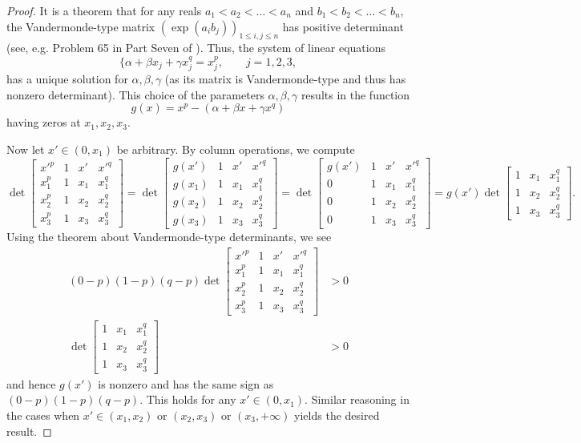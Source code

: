 \documentclass[10pt]{amsart}
\newcommand{\1}{\textbf{1}}
\theoremstyle{remark}
\theoremstyle{definition}
\begin{document}
\begin{proof}
It is a theorem that for any reals $a_1<a_2<\dots<a_n$ and $b_1<b_2<\dots<b_n$, the Vandermonde-type matrix $(\exp(a_ib_j))_{1\le i,j \le n}$ has positive determinant (see, e.g. Problem 65 in Part Seven of \cite{PS}).
Thus, the system of linear equations 
\[ 
\Big\{ \alpha + \beta x_j + \gamma x_j^q = x_j^p, \qquad j = 1, 2, 3,
 \]
has a unique solution for $\alpha, \beta, \gamma$ (as its matrix is Vandermonde-type and thus has nonzero determinant). This choice of the parameters $\alpha, \beta, \gamma$ results in the function
\[ 
g(x) = x^p - (\alpha + \beta x + \gamma x^q)
 \]
having zeros at $x_1, x_2, x_3$. 

Now let $x'\in(0,x_1)$ be arbitrary. By column operations, we compute \[\det\left[\begin{smallmatrix}
x'^p&1&x'&x'^q\\ x_1^p & 1& x_1 & x_1^q \\ x_2^p &1& x_2 & x_2^q\\ x_3^p &1& x_3 & x_3^q
\end{smallmatrix}\right] = \det\left[\begin{smallmatrix}
g(x')&1&x'&x'^q\\ g(x_1) & 1& x_1 & x_1^q \\ g(x_2) &1& x_2 & x_2^q\\ g(x_3) &1& x_3 & x_3^q
\end{smallmatrix}\right] = \det\left[\begin{smallmatrix}
g(x')&1&x'&x'^q\\ 0 & 1& x_1 & x_1^q \\ 0 &1& x_2 & x_2^q\\ 0 &1& x_3 & x_3^q
\end{smallmatrix}\right] = g(x') \det\left[\begin{smallmatrix}
  1& x_1 & x_1^q \\ 1& x_2 & x_2^q\\ 1& x_3 & x_3^q
\end{smallmatrix}\right].\] Using the theorem about Vandermonde-type determinants, we see \begin{align*}
    (0-p)(1-p)(q-p)\det\left[\begin{smallmatrix}
x'^p&1&x'&x'^q\\ x_1^p & 1& x_1 & x_1^q \\ x_2^p &1& x_2 & x_2^q\\ x_3^p &1& x_3 & x_3^q
\end{smallmatrix}\right] &> 0 \\
\det\left[\begin{smallmatrix}
  1& x_1 & x_1^q \\ 1& x_2 & x_2^q\\ 1& x_3 & x_3^q
\end{smallmatrix}\right] &> 0
\end{align*} and hence $g(x')$ is nonzero and has the same sign as $(0-p)(1-p)(q-p)$. This holds for any $x' \in (0,x_1)$. Similar reasoning in the cases when $x' \in (x_1,x_2)$ or $(x_2,x_3)$ or $(x_3,+\infty)$ yields the desired result.\end{proof}
\end{document}
